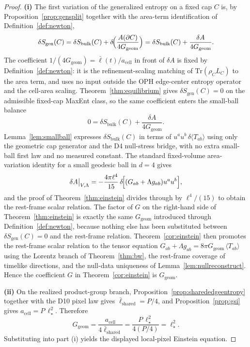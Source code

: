 \documentclass[11pt]{article}
\begin{document}
\begin{proof}
\textbf{(i)} The first variation of the generalized entropy on a fixed cap \(C\) is, by Proposition~\ref{prop:gensplit} together with the area-term identification of Definition~\ref{def:newton},
\[
\delta S_{\mathrm{gen}}(C)
=\delta S_{\mathrm{bulk}}(C)
+\delta\!\Bigl(\frac{A(\partial C)}{4G_{\mathrm{geom}}}\Bigr)
=\delta S_{\mathrm{bulk}}(C)+\frac{\delta A}{4G_{\mathrm{geom}}}.
\]
The coefficient \(1/(4G_{\mathrm{geom}})=\bar\ell(t)/a_{\mathrm{cell}}\) in front of \(\delta A\) is fixed by Definition~\ref{def:newton}: it is the refinement-scaling matching of \(\mathrm{Tr}(\rho_C L_C)\) to the area term, and uses no input outside the OPH edge-center entropy operator and the cell-area scaling. Theorem~\ref{thm:equilibrium} gives \(\delta S_{\mathrm{gen}}(C)=0\) on the admissible fixed-cap MaxEnt class, so the same coefficient enters the small-ball balance
\[
0=\delta S_{\mathrm{bulk}}(C)+\frac{\delta A}{4G_{\mathrm{geom}}}.
\]
Lemma~\ref{lem:smallball} expresses \(\delta S_{\mathrm{bulk}}(C)\) in terms of \(u^au^b\,\delta\langle T_{ab}\rangle\) using only the geometric cap generator and the D4 null-stress bridge, with no extra small-ball first law and no measured constant. The standard fixed-volume area-variation identity for a small geodesic ball in \(d=4\) gives
\[
\delta A\big|_{V,\Lambda}=-\frac{4\pi\ell^4}{15}\,\delta\!\Bigl[(G_{ab}+\Lambda g_{ab})u^au^b\Bigr],
\]
and the proof of Theorem~\ref{thm:einstein} divides through by \(\ell^4/(15)\) to obtain the rest-frame scalar relation. The factor of \(G\) on the right-hand side of Theorem~\ref{thm:einstein} is exactly the same \(G_{\mathrm{geom}}\) introduced through Definition~\ref{def:newton}, because nothing else has been substituted between \(\delta S_{\mathrm{gen}}(C)=0\) and the rest-frame relation. Theorem~\ref{cor:einstein} then promotes the rest-frame scalar relation to the tensor equation \(G_{ab}+\Lambda g_{ab}=8\pi G_{\mathrm{geom}}\,\langle T_{ab}\rangle\) using the Lorentz branch of Theorem~\ref{thm:bw}, the rest-frame coverage of timelike directions, and the null-data uniqueness of Lemma~\ref{lem:nullreconstruct}. Hence the coefficient \(G\) in Theorem~\ref{cor:einstein} is \(G_{\mathrm{geom}}\).

\textbf{(ii)} On the realized product-group branch, Proposition~\ref{prop:sharededgeentropy} together with the D10 pixel law gives \(\bar\ell_{\mathrm{shared}}=P/4\), and Proposition~\ref{prop:gsi} gives \(a_{\mathrm{cell}}=P\,\ell_\star^2\). Therefore
\[
G_{\mathrm{geom}}=\frac{a_{\mathrm{cell}}}{4\bar\ell_{\mathrm{shared}}}=\frac{P\,\ell_\star^2}{4(P/4)}=\ell_\star^2.
\]
Substituting into part (i) yields the displayed local-pixel Einstein equation.


\end{proof}
\end{document}
